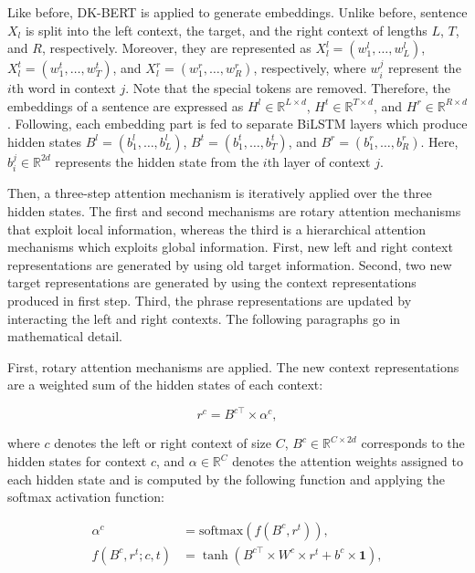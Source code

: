 \documentclass[american, oneside]{ecsgdp}
\begin{document}
Like before, DK-BERT is applied to generate embeddings. Unlike before, sentence $X_l$ is split into the left context, the target, and the right context of lengths $L$, $T$, and $R$, respectively. Moreover, they are represented as $X_l^l = \left ( w_1^l, \ldots, w_L^l \right )$, $X_l^t = \left ( w_1^t, \ldots, w_T^t \right )$, and $X_l^r = \left ( w_1^r, \ldots, w_R^r \right )$, respectively, where $w_i^j$ represent the $i$th word in context $j$. Note that the special tokens are removed. Therefore, the embeddings of a sentence are expressed as $H^l \in \mathbb{R}^{L \times d}$, $H^t \in \mathbb{R}^{T \times d}$, and $H^r \in \mathbb{R}^{R \times d}$. Following, each embedding part is fed to separate BiLSTM layers which produce hidden states $B^l = \left( b_1^l, \dots, b_L^l \right)$, $B^t = \left( b_1^t, \dots, b_T^t \right)$, and $B^r = \left( b_1^r, \dots, b_R^r \right)$. Here, $b_i^j \in \mathbb{R}^{2d}$ represents the hidden state from the $i$th layer of context $j$.

Then, a three-step attention mechanism is iteratively applied over the three hidden states. The first and second mechanisms are rotary attention mechanisms that exploit local information, whereas the third is a hierarchical attention mechanisms which exploits global information. First, new left and right context representations are generated by using old target information. Second, two new target representations are generated by using the context representations produced in first step. Third, the phrase representations are updated by interacting the left and right contexts. The following paragraphs go in mathematical detail.

First, rotary attention mechanisms are applied. The new context representations are a weighted sum of the hidden states of each context: 

\begin{equation}
    r^c = B^{c\top} \times \alpha^c,
\end{equation}

\noindent where $c$ denotes the left or right context of size $C$, $B^c \in \mathbb{R}^{C \times 2d}$ corresponds to the hidden states for context $c$, and $\alpha \in \mathbb{R}^{C}$ denotes the attention weights assigned to each hidden state and is computed by the following function and applying the softmax activation function:

\begin{align}
    \alpha^c                         & = \text{softmax}\left( f \left( B^c, r^t\right) \right), \\
    f \left( B^c, r^t; c, t \right) & = \tanh{\left( B^{c\top} \times W^c \times r^t + b^c \times \mathbf{1} \right)},
\end{align}
\end{document}
